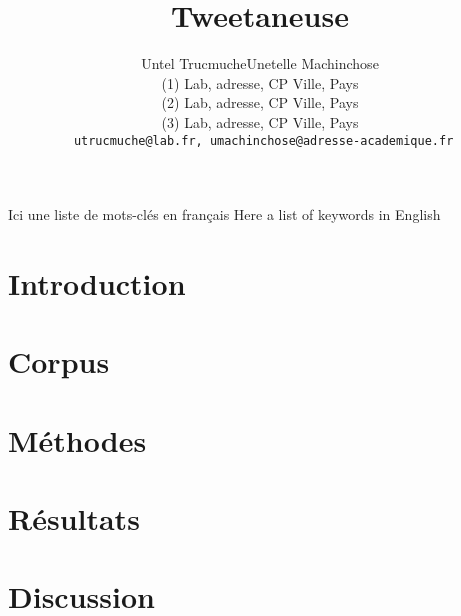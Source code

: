 \documentclass[10pt,twoside]{article}
\title{Tweetaneuse}
\author{Untel Trucmuche\up{1, 2}\quad Unetelle Machinchose\up{1, 3}\\
  {\small
    (1) Lab, adresse, CP Ville, Pays \\ 
    (2) Lab, adresse, CP Ville, Pays \\ 
    (3) Lab, adresse, CP Ville, Pays \\ 
    \texttt{
      utrucmuche@lab.fr, umachinchose@adresse-academique.fr \\ 
}}}
\begin{document}
\maketitle

\resume{

}


\motsClefs
  {Ici une liste de mots-clés en français}
  {Here a list of keywords in English}


\section{Introduction}


\section{Corpus}


\section{Méthodes}


\section{Résultats}


\section{Discussion}







\end{document}
